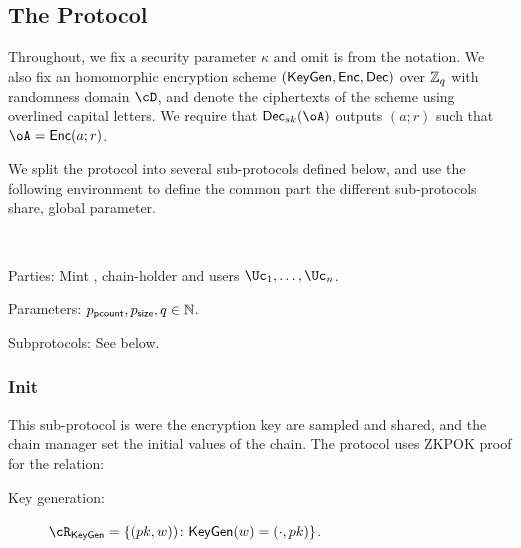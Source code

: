 \subsection{The Protocol}\label{sec:MainProtocol:Protocol}
Throughout, we fix a security parameter $\kappa$ and omit is from the notation. We also fix an homomorphic encryption scheme $(\mathsf{KeyGen},\mathsf{Enc},\mathsf{Dec})$ over ${\mathbb Z}_q$ with randomness domain $\cD$, and denote the ciphertexts of the scheme using  overlined capital letters.   We require that $\Dec_{sk}(\oA)$ outputs   $(a;r)$ such that $\oA = \Enc(a;r)$.


We split  the protocol into several sub-protocols defined below, and  use the  following environment to define the common part the different sub-protocols share, \eg global parameter. 

\begin{protocol}~\label{prot:ConfidentialTransactions}


	
\item[Parties:] Mint \Mc, chain-holder \Cc and users  $\Uc_1, \ldots,\Uc_n$.

\item[Parameters:] $p_{\mathsf{pcount}},p_{\mathsf{size}},q \in {\mathbb{N}}$.

\item[Subprotocols:]  See below.
\end{protocol}


\subsubsection{Init}


This sub-protocol is were the encryption key are sampled and shared, and the chain manager \Cc set the initial values of the chain. The protocol  uses ZKPOK proof for the relation:
\begin{description}
	\item[Key generation:]    $\rKeyGen =\rKeyGenDef$.
\end{description}


